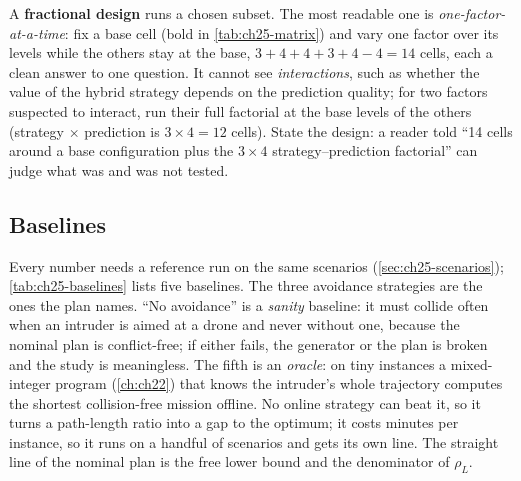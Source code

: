 A \textbf{fractional design} runs a chosen subset.
The most readable one is \emph{one-factor-at-a-time}: fix a base cell (bold
in \cref{tab:ch25-matrix}) and vary one factor over its levels while the
others stay at the base, $3 + 4 + 4 + 3 + 4 - 4 = 14$ cells, each a clean
answer to one question. It cannot see \emph{interactions}, such as whether
the value of the hybrid strategy depends on the prediction quality; for two
factors suspected to interact, run their full factorial at the base levels
of the others (strategy $\times$ prediction is $3 \times 4 = 12$ cells).
State the design: a reader told ``14 cells around a base configuration plus
the $3 \times 4$ strategy--prediction factorial'' can judge what was and was
not tested.

\subsection{Baselines}

Every number needs a reference run on the same scenarios
(\cref{sec:ch25-scenarios}); \cref{tab:ch25-baselines} lists five
baselines. The three avoidance strategies are
the ones the plan names. ``No avoidance'' is a \emph{sanity} baseline: it
must collide often when an intruder is aimed at a drone and never without
one, because the nominal plan is conflict-free; if either fails, the
generator or the plan is broken and the study is meaningless. The fifth is
an \emph{oracle}: on tiny instances a mixed-integer
program (\cref{ch:ch22}) that knows the intruder's whole trajectory computes
the shortest collision-free mission offline. No online strategy can beat it,
so it turns a path-length ratio into a gap to the optimum; it costs minutes
per instance, so it runs on a handful of scenarios and gets its own line.
The straight line of the nominal plan is the free lower bound and the
denominator of $\rho_L$.

